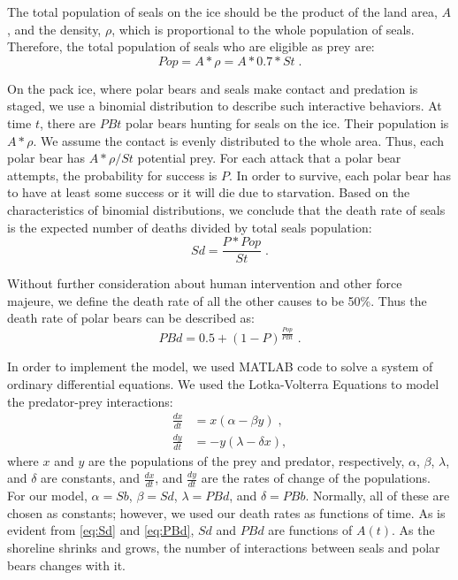 \documentclass[reqno,11pt]{amsart}
\begin{document}
The total population of seals on the ice should be the product of the land area, $A$, and the density, $\rho$, which is proportional to the whole population of seals. Therefore, the total population of seals who are eligible as prey are:
\begin{equation}
\label{eq:Pop}
Pop = A * \rho = A * 0.7 * St\;.
\end{equation}

On the pack ice, where polar bears and seals make contact and predation is staged, we use a binomial distribution to describe such interactive behaviors. At time $t$, there are $PBt$ polar bears hunting for seals on the ice. Their population is $A * \rho$. We assume the contact is evenly distributed to the whole area. Thus, each polar bear has $A * \rho / St$ potential prey. For each attack that a polar bear attempts, the probability for success is $P$. In order to survive, each polar bear has to have at least some success or it will die due to starvation. Based on the characteristics of binomial distributions, we conclude that the death rate of seals is the expected number of deaths divided by total seals population:
\begin{equation}
\label{eq:Sd}
Sd = \frac{P * Pop}{St}\;.
\end{equation}

Without further consideration about human intervention and other force majeure, we define the death rate of all the other causes to be 50\%. Thus the death rate of polar bears can be described as: 
\begin{equation}
\label{eq:PBd}
PBd = 0.5 + (1 - P)^\frac{Pop}{PBt}\;.
\end{equation}

In order to implement the model, we used MATLAB code to solve a system of ordinary differential equations. We used the Lotka-Volterra Equations\cite{Lotka} to model the predator-prey interactions: 
\begin{equation}
\label{eq:lotka_volterra}
\begin{split}
\frac{dx}{dt} &= x(\alpha - \beta y)\;, \\
\frac{dy}{dt} &= -y(\lambda - \delta x),
\end{split}
\end{equation}
where $x$ and $y$ are the populations of the prey and predator, respectively, $\alpha$, $\beta$, $\lambda$, and $\delta$ are constants, and $\frac{dx}{dt}$, and $\frac{dy}{dt}$ are the rates of change of the populations. For our model, $\alpha = Sb$, $\beta = Sd$, $\lambda = PBd$, and $\delta = PBb$. Normally, all of these are chosen as constants; however, we used our death rates as functions of time. As is evident from \eqref{eq:Sd} and \eqref{eq:PBd}, $Sd$ and $PBd$ are functions of $A(t)$. As the shoreline shrinks and grows, the number of interactions between seals and polar bears changes with it.
\end{document}
